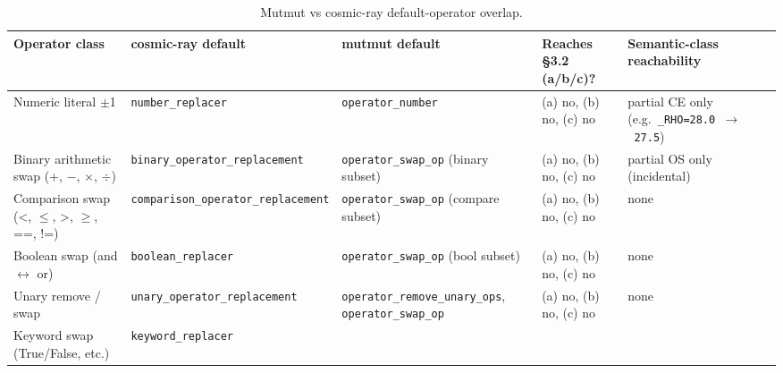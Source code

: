 \documentclass[manuscript,screen,review]{acmart}
\begin{document}
{\scriptsize
\begin{longtable}[]{@{}
  >{\raggedright\arraybackslash}p{}
  >{\raggedright\arraybackslash}p{}
  >{\raggedright\arraybackslash}p{}
  >{\raggedright\arraybackslash}p{}
  >{\raggedright\arraybackslash}p{}@{}}
\caption{Mutmut vs cosmic-ray default-operator overlap.}\label{tab:p2-19}\\
\toprule\noalign{}
\begin{minipage}[b]{\linewidth}\raggedright
Operator class
\end{minipage} & \begin{minipage}[b]{\linewidth}\raggedright
cosmic-ray default
\end{minipage} & \begin{minipage}[b]{\linewidth}\raggedright
mutmut default
\end{minipage} & \begin{minipage}[b]{\linewidth}\raggedright
Reaches §3.2 (a/b/c)?
\end{minipage} & \begin{minipage}[b]{\linewidth}\raggedright
Semantic-class reachability
\end{minipage} \\
\midrule\noalign{}
\endfirsthead
\endhead
\bottomrule\noalign{}
\endlastfoot
Numeric literal $\pm$1 & \texttt{number\_replacer} &
\texttt{operator\_number} & (a) no, (b) no, (c) no & partial CE only
(e.g.~\texttt{\_RHO=28.0\ $\to$\ 27.5}) \\
Binary arithmetic swap (+, $-$, $\times$, $\div$) &
\texttt{binary\_operator\_replacement} & \texttt{operator\_swap\_op}
(binary subset) & (a) no, (b) no, (c) no & partial OS only
(incidental) \\
Comparison swap (\textless, $\leq$, \textgreater, $\geq$, ==, !=) &
\texttt{comparison\_operator\_replacement} & \texttt{operator\_swap\_op}
(compare subset) & (a) no, (b) no, (c) no & none \\
Boolean swap (and $\leftrightarrow$ or) & \texttt{boolean\_replacer} &
\texttt{operator\_swap\_op} (bool subset) & (a) no, (b) no, (c) no &
none \\
Unary remove / swap & \texttt{unary\_operator\_replacement} &
\texttt{operator\_remove\_unary\_ops}, \texttt{operator\_swap\_op} & (a)
no, (b) no, (c) no & none \\
Keyword swap (True/False, etc.) & \texttt{keyword\_replacer} &

\end{longtable}}
\end{document}

